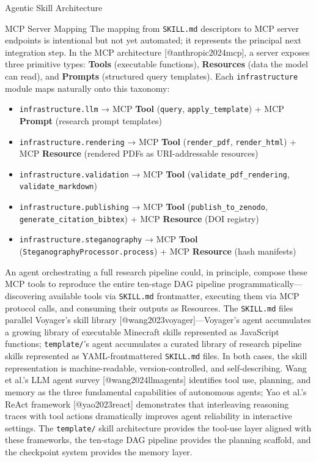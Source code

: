 \documentclass[
  ignorenonframetext,
]{beamer}
\providecommand{\tightlist}{%
  \setlength{\itemsep}{0pt}\setlength{\parskip}{0pt}}
\begin{document}
\begin{frame}[fragile]{Agentic Skill Architecture}
\begin{block}{MCP Server Mapping}
\protect{}\label{mcp-server-mapping}
The mapping from \texttt{SKILL.md} descriptors to MCP server endpoints
is intentional but not yet automated; it represents the principal next
integration step. In the MCP architecture {[}@anthropic2024mcp{]}, a
server exposes three primitive types: \textbf{Tools} (executable
functions), \textbf{Resources} (data the model can read), and
\textbf{Prompts} (structured query templates). Each
\texttt{infrastructure} module maps naturally onto this taxonomy:

\begin{itemize}
\tightlist
\item
  \texttt{infrastructure.llm} → MCP \textbf{Tool} (\texttt{query},
  \texttt{apply\_template}) + MCP \textbf{Prompt} (research prompt
  templates)
\item
  \texttt{infrastructure.rendering} → MCP \textbf{Tool}
  (\texttt{render\_pdf}, \texttt{render\_html}) + MCP \textbf{Resource}
  (rendered PDFs as URI-addressable resources)
\item
  \texttt{infrastructure.validation} → MCP \textbf{Tool}
  (\texttt{validate\_pdf\_rendering}, \texttt{validate\_markdown})
\item
  \texttt{infrastructure.publishing} → MCP \textbf{Tool}
  (\texttt{publish\_to\_zenodo}, \texttt{generate\_citation\_bibtex}) +
  MCP \textbf{Resource} (DOI registry)
\item
  \texttt{infrastructure.steganography} → MCP \textbf{Tool}
  (\texttt{SteganographyProcessor.process}) + MCP \textbf{Resource}
  (hash manifests)
\end{itemize}

An agent orchestrating a full research pipeline could, in principle,
compose these MCP tools to reproduce the entire ten-stage DAG pipeline
programmatically---discovering available tools via \texttt{SKILL.md}
frontmatter, executing them via MCP protocol calls, and consuming their
outputs as Resources. The \texttt{SKILL.md} files parallel Voyager's
skill library {[}@wang2023voyager{]}---Voyager's agent accumulates a
growing library of executable Minecraft skills represented as JavaScript
functions; \texttt{template/}'s agent accumulates a curated library of
research pipeline skills represented as YAML-frontmattered
\texttt{SKILL.md} files. In both cases, the skill representation is
machine-readable, version-controlled, and self-describing. Wang et al.'s
LLM agent survey {[}@wang2024llmagents{]} identifies tool use, planning,
and memory as the three fundamental capabilities of autonomous agents;
Yao et al.'s ReAct framework {[}@yao2023react{]} demonstrates that
interleaving reasoning traces with tool actions dramatically improves
agent reliability in interactive settings. The \texttt{template/} skill
architecture provides the tool-use layer aligned with these frameworks,
the ten-stage DAG pipeline provides the planning scaffold, and the
checkpoint system provides the memory layer.
\end{block}
\end{frame}
\end{document}
